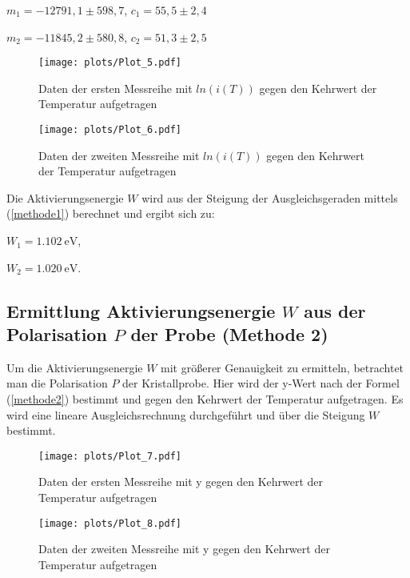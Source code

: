  \begin{center}
$m_1=-12791,1 \pm 598,7 $, $c_1=55,5 \pm 2,4$
\end{center}

\begin{center}
$m_2=-11845,2 \pm 580,8$, $c_2=51,3 \pm 2,5$
\end{center}


\begin{figure} [H]
  \centering
  \texttt{[image: plots/Plot\_5.pdf]}
  \caption{Daten der ersten Messreihe mit $ln(i(T))$ gegen den Kehrwert der Temperatur aufgetragen}
  \label{fig:plot5}
\end{figure}

\begin{figure}[H]
  \centering
  \texttt{[image: plots/Plot\_6.pdf]}
  \caption{Daten der zweiten Messreihe mit $ln(i(T))$ gegen den Kehrwert der Temperatur aufgetragen}
  \label{fig:plot6}
\end{figure}

Die Aktivierungsenergie $W$ wird aus der Steigung der Ausgleichsgeraden mittels (\ref{methode1}) berechnet und ergibt sich zu:

 \begin{center}
$W_1=\SI{1,102}{\electronvolt}$,
\end{center}

 \begin{center}
$W_2=\SI{1,020}{\electronvolt}$.
\end{center}

 \subsection{Ermittlung Aktivierungsenergie $W$ aus der Polarisation $P$ der Probe (Methode 2)}

 Um die Aktivierungsenergie $W$ mit größerer Genauigkeit  zu ermitteln, betrachtet man die Polarisation $P$ der Kristallprobe. Hier wird der y-Wert nach der Formel (\ref{methode2}) bestimmt und gegen den Kehrwert der Temperatur aufgetragen. Es wird eine lineare Ausgleichsrechnung durchgeführt und über die Steigung $W$ bestimmt.

 \begin{figure}[H]
  \centering
  \texttt{[image: plots/Plot\_7.pdf]}
  \caption{Daten der ersten Messreihe mit y gegen den Kehrwert der Temperatur aufgetragen}
  \label{fig:plot7}
\end{figure}

\begin{figure}[H]
  \centering
  \texttt{[image: plots/Plot\_8.pdf]}
  \caption{Daten der zweiten Messreihe mit y gegen den Kehrwert der Temperatur aufgetragen}
  \label{fig:plot8}
\end{figure}

